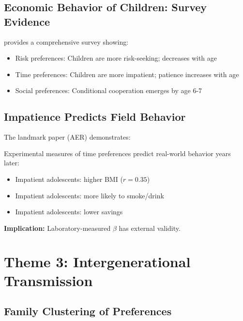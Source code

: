 \subsection{Economic Behavior of Children: Survey Evidence}

\citet{sutter2019economic} provides a comprehensive survey showing:
\begin{itemize}
\item Risk preferences: Children are more risk-seeking; decreases with age
\item Time preferences: Children are more impatient; patience increases with age
\item Social preferences: Conditional cooperation emerges by age 6-7
\end{itemize}

\subsection{Impatience Predicts Field Behavior}

The landmark paper \citet{sutter2013impatience} (AER) demonstrates:

\begin{tcolorbox}[colback=blue!5!white, colframe=blue!75!black,
    title=Key Result UNMAPPED_SU-3: Lab-Field Validity]
Experimental measures of time preferences predict real-world behavior years later:
\begin{itemize}[nosep]
\item Impatient adolescents: higher BMI ($r = 0.35$)
\item Impatient adolescents: more likely to smoke/drink
\item Impatient adolescents: lower savings
\end{itemize}
\textbf{Implication:} Laboratory-measured $\beta$ has external validity.
\end{tcolorbox}


\section{Theme 3: Intergenerational Transmission}
\label{sec:su-intergenerational}

\subsection{Family Clustering of Preferences}

